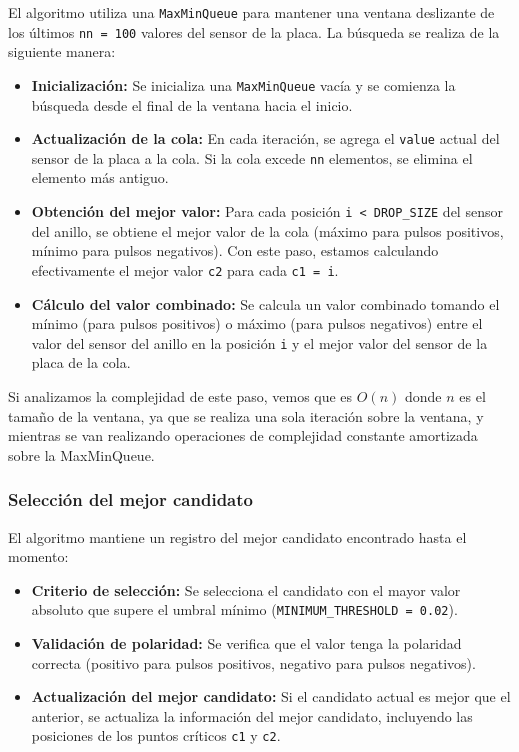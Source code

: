 \documentclass[12pt,a4paper]{article}
\begin{document}
El algoritmo utiliza una \texttt{MaxMinQueue} para mantener una ventana deslizante de los últimos \texttt{nn = 100} valores del sensor de la placa. La búsqueda se realiza de la siguiente manera:

\begin{itemize}
    \item \textbf{Inicialización:} Se inicializa una \texttt{MaxMinQueue} vacía y se comienza la búsqueda desde el final de la ventana hacia el inicio.
    
    \item \textbf{Actualización de la cola:} En cada iteración, se agrega el \texttt{value} actual del sensor de la placa a la cola. Si la cola excede \texttt{nn} elementos, se elimina el elemento más antiguo.
    
    \item \textbf{Obtención del mejor valor:} Para cada posición \texttt{i <\ DROP\_SIZE} del sensor del anillo, se obtiene el mejor valor de la cola (máximo para pulsos positivos, mínimo para pulsos negativos). Con este paso, estamos calculando efectivamente el mejor valor \texttt{c2} para cada \texttt{c1 = i}.
    
    \item \textbf{Cálculo del valor combinado:} Se calcula un valor combinado tomando el mínimo (para pulsos positivos) o máximo (para pulsos negativos) entre el valor del sensor del anillo en la posición \texttt{i} y el mejor valor del sensor de la placa de la cola.
\end{itemize}

Si analizamos la complejidad de este paso, vemos que es $O(n)$ donde $n$ es el tamaño de la ventana, ya que se realiza una sola iteración sobre la ventana, y mientras se van realizando operaciones de complejidad constante amortizada sobre la MaxMinQueue.

\subsubsection{Selección del mejor candidato}

El algoritmo mantiene un registro del mejor candidato encontrado hasta el momento:

\begin{itemize}
    \item \textbf{Criterio de selección:} Se selecciona el candidato con el mayor valor absoluto que supere el umbral mínimo (\texttt{MINIMUM\_THRESHOLD = 0.02}).
    
    \item \textbf{Validación de polaridad:} Se verifica que el valor tenga la polaridad correcta (positivo para pulsos positivos, negativo para pulsos negativos).
    
    \item \textbf{Actualización del mejor candidato:} Si el candidato actual es mejor que el anterior, se actualiza la información del mejor candidato, incluyendo las posiciones de los puntos críticos \texttt{c1} y \texttt{c2}.
\end{itemize}
\end{document}
